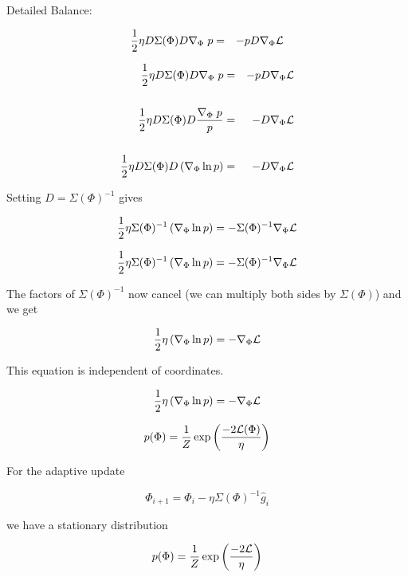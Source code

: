 {\vfill
Detailed Balance:

\vfill
\vspace{-2ex}
\begin{eqnarray*}
\frac{1}{2} \eta D\Sigma(\Phi) D \nabla_\Phi\; {p} & = & - p D \nabla_\Phi {\cal L}
\end{eqnarray*}


\vspace{-2ex}
\begin{eqnarray*}
\frac{1}{2} \eta D\Sigma(\Phi) D \nabla_\Phi\; {p} & = & - p D \nabla_\Phi {\cal L} \\
\\
\frac{1}{2} \eta D \Sigma(\Phi)  D \frac{\nabla_\Phi\;p}{p} & = & - D \nabla_\Phi {\cal L} \\
\\
\frac{1}{2} \eta D \Sigma(\Phi) D \left(\nabla_\Phi \ln p\right) & = &  - D \nabla_\Phi {\cal L}
\end{eqnarray*}

\vfill
Setting {\color{red} $D = \Sigma(\Phi)^{-1}$} gives

\vfill
$$\frac{1}{2} \eta \Sigma(\Phi)^{-1} \left(\nabla_\Phi \ln p\right) = - \Sigma(\Phi)^{-1} \nabla_\Phi {\cal L}$$


$$\frac{1}{2} \eta \Sigma(\Phi)^{-1} \left(\nabla_\Phi \ln p\right) = - \Sigma(\Phi)^{-1} \nabla_\Phi {\cal L}$$

\vfill
The factors of $\Sigma(\Phi)^{-1}$ now cancel (we can multiply both sides by $\Sigma(\Phi)$) and we get

\vfill
$$\frac{1}{2} \eta \left(\nabla_\Phi \ln p\right)  =  - \nabla_\Phi {\cal L}$$

\vfill
This equation is independent of coordinates.


$$\frac{1}{2} \eta \left(\nabla_\Phi \ln p\right)  =  - \nabla_\Phi {\cal L}$$

\vfill
$$p(\Phi) = \frac{1}{Z} \exp\left(\frac{-2{\cal L}(\Phi)}{\eta}\right)$$


For the adaptive update

\vfill
$$\Phi_{i+1} = \Phi_{i} - \eta \Sigma(\Phi)^{-1} \hat{g}_i$$

\vfill
we have a stationary distribution

\vfill
$$p(\Phi) = \frac{1}{Z} \exp\left(\frac{-2{\cal L}}{\eta}\right)$$


}
